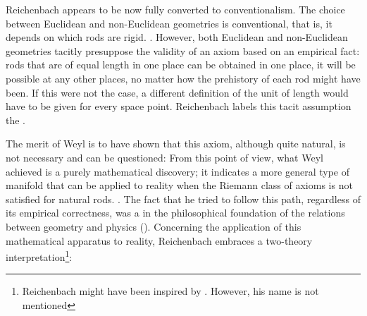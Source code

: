 \documentclass[draft]{article}
\begin{document}


Reichenbach appears to be now fully converted to conventionalism. The choice between Euclidean and non-Euclidean geometries is conventional, that is, it depends on which rods are rigid. \citep[366]{Reichenbach1922}. However, both Euclidean and non-Euclidean geometries tacitly presuppose the validity of an axiom based on an empirical fact: rods that are of equal length in one place can be obtained in one place, it will be possible at any other places, no matter how the prehistory of each rod might have been. If this were not the case, a different definition of the unit of length would have to be given for every space point. Reichenbach labels this tacit assumption the  \citep[366]{Reichenbach1922}. 

The merit of Weyl is to have shown that this axiom, although quite natural, is not necessary and can be questioned: From this point of view, what Weyl achieved is a purely mathematical discovery; it indicates a more general type of manifold that can be applied to reality when the Riemann class of axioms is not satisfied for natural rods.  \citep[365]{Reichenbach1922a}. The fact that he tried to follow this path, regardless of its empirical correctness, was a  in the philosophical foundation of the relations between geometry and physics (\citealp[367f.]{Reichenbach1921}). Concerning the application of this mathematical apparatus to reality, Reichenbach embraces a two-theory interpretation\footnote{Reichenbach might have been inspired by \citet{Pauli1921}. However, his name is not mentioned}:
\end{document}
